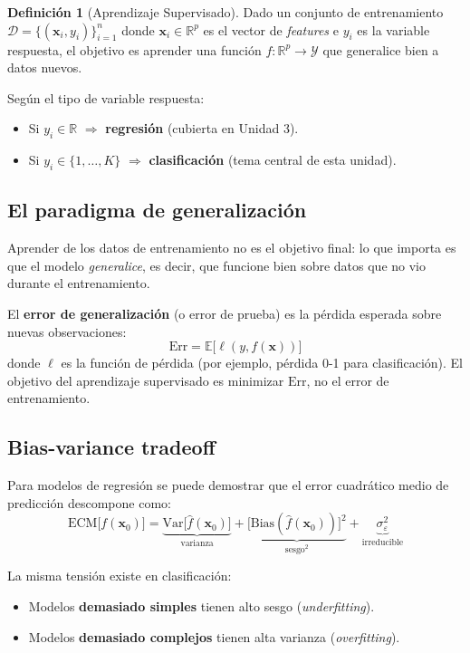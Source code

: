 \documentclass[12pt, a4paper]{article}
\theoremstyle{definition}
\newtheorem{definicion}{Definición}[section]
\theoremstyle{plain}
\theoremstyle{remark}
\newcommand{\R}{\mathbb{R}}
\newcommand{\E}{\mathbb{E}}
\newcommand{\bx}{\bm{x}}
\begin{document}
\begin{definicion}[Aprendizaje Supervisado]
Dado un conjunto de entrenamiento $\mathcal{D} = \{(\bx_i, y_i)\}_{i=1}^{n}$ donde $\bx_i \in \R^p$ es el vector de \emph{features} e $y_i$ es la variable respuesta, el objetivo es aprender una función $f: \R^p \to \mathcal{Y}$ que generalice bien a datos nuevos.
\end{definicion}

Según el tipo de variable respuesta:
\begin{itemize}
  \item Si $y_i \in \R$ \quad $\Rightarrow$ \textbf{regresión} (cubierta en Unidad 3).
  \item Si $y_i \in \{1, \ldots, K\}$ \quad $\Rightarrow$ \textbf{clasificación} (tema central de esta unidad).
\end{itemize}

\subsection{El paradigma de generalización}

Aprender de los datos de entrenamiento no es el objetivo final: lo que importa es que el modelo \emph{generalice}, es decir, que funcione bien sobre datos que no vio durante el entrenamiento.

\begin{conceptoclave}
  El \textbf{error de generalización} (o error de prueba) es la pérdida esperada sobre nuevas observaciones:
  \[
    \text{Err} = \E\bigl[\ell(y, f(\bx))\bigr]
  \]
  donde $\ell$ es la función de pérdida (por ejemplo, pérdida 0-1 para clasificación). El objetivo del aprendizaje supervisado es minimizar $\text{Err}$, no el error de entrenamiento.
\end{conceptoclave}

\subsection{Bias-variance tradeoff}

Para modelos de regresión se puede demostrar que el error cuadrático medio de predicción descompone como:
\[
  \text{ECM}\bigl[f(\bx_0)\bigr]
  = \underbrace{\text{Var}\bigl[\hat{f}(\bx_0)\bigr]}_{\text{varianza}}
  + \underbrace{\bigl[\text{Bias}(\hat{f}(\bx_0))\bigr]^2}_{\text{sesgo}^2}
  + \underbrace{\sigma^2_\varepsilon}_{\text{irreducible}}
\]

La misma tensión existe en clasificación:
\begin{itemize}
  \item Modelos \textbf{demasiado simples} tienen alto sesgo (\textit{underfitting}).
  \item Modelos \textbf{demasiado complejos} tienen alta varianza (\textit{overfitting}).
\end{itemize}
\end{document}
